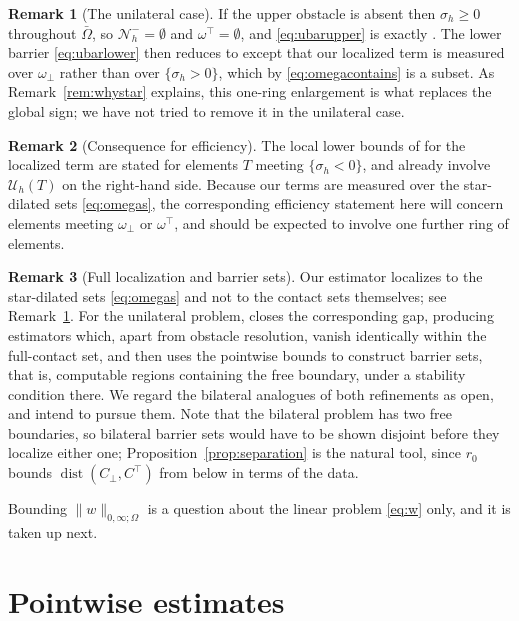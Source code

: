\documentclass[12pt]{amsart}
\theoremstyle{definition}
\newtheorem{remark}{Remark}
\newcommand{\Om}{\Omega}
\newcommand{\Cbot}{C_\bot}
\newcommand{\Ctop}{C^\top}
\newcommand{\Nh}{\mathcal{N}_h}
\newcommand{\Uh}{\mathcal{U}_h}
\newcommand{\ombot}{\omega_\bot}
\newcommand{\omtop}{\omega^\top}
\begin{document}
\begin{remark}[The unilateral case]
\label{rem:unilateral}
If the upper obstacle is absent then $\sigma_h \ge 0$ throughout $\bar\Om$, so $\Nh^- = \emptyset$ and $\omtop = \emptyset$, and \eqref{eq:ubarupper} is exactly \cite[formula (4.2)]{NSV03}.  The lower barrier \eqref{eq:ubarlower} then reduces to \cite[formula (4.6)]{NSV03} except that our localized term is measured over $\ombot$ rather than over $\{\sigma_h>0\}$, which by \eqref{eq:omegacontains} is a subset.  As Remark~\ref{rem:whystar} explains, this one-ring enlargement is what replaces the global sign; we have not tried to remove it in the unilateral case.
\end{remark}

\begin{remark}[Consequence for efficiency]
\label{rem:effring}
The local lower bounds of \cite[Prop.~6.3]{NSV03} for the localized term are stated for elements $T$ meeting $\{\sigma_h<0\}$, and already involve $\Uh(T)$ on the right-hand side.  Because our terms are measured over the star-dilated sets \eqref{eq:omegas}, the corresponding efficiency statement here will concern elements meeting $\ombot$ or $\omtop$, and should be expected to involve one further ring of elements.
\end{remark}

\begin{remark}[Full localization and barrier sets]
\label{rem:localization}
Our estimator localizes to the star-dilated sets \eqref{eq:omegas} and not to the contact sets themselves; see Remark~\ref{rem:unilateral}.  For the unilateral problem, \cite{NSV05} closes the corresponding gap, producing estimators which, apart from obstacle resolution, vanish identically within the full-contact set, and then uses the pointwise bounds to construct barrier sets, that is, computable regions containing the free boundary, under a stability condition there.  We regard the bilateral analogues of both refinements as open, and intend to pursue them.  Note that the bilateral problem has two free boundaries, so bilateral barrier sets would have to be shown disjoint before they localize either one; Proposition~\ref{prop:separation} is the natural tool, since $r_0$ bounds $\operatorname{dist}(\Cbot,\Ctop)$ from below in terms of the data.
\end{remark}

Bounding $\|w\|_{0,\infty;\Om}$ is a question about the linear problem \eqref{eq:w} only, and it is taken up next.


\section{Pointwise estimates} \label{sec:pointwise}
\end{document}
